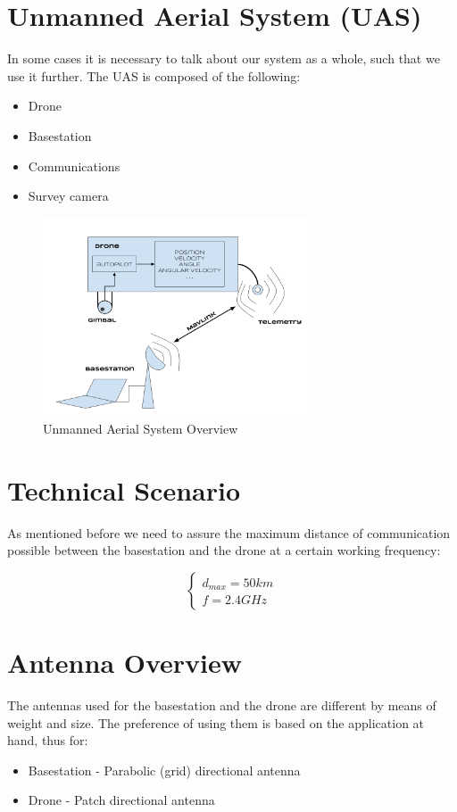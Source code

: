 \section*{Unmanned Aerial System (UAS)}
In some cases it is necessary to talk about our system as a whole, such that we use it further. The UAS is composed of the following:
\begin{itemize}
	\item Drone
	\item Basestation
	\item Communications
	\item Survey camera
\end{itemize}

\begin{figure}[h!]\label{fig:uas}
	\centering
	\includegraphics[width=0.7\textwidth]{figures/uas.png}
	\caption{Unmanned Aerial System Overview}
\end{figure}

\section*{Technical Scenario}
As mentioned before we need to assure the maximum distance of communication possible between the basestation and the drone at a certain working frequency:

\begin{equation*}\label{eq:tech_parameters1} 
 	\begin{cases}
 		d_{max} = 50 km	\\
 		f = 2.4 GHz
 	\end{cases}
\end{equation*}

\section*{Antenna Overview}
The antennas used for the basestation and the drone are different by means of weight and size. The preference of using them is based on the application at hand, thus for:
\begin{itemize}
	\item Basestation - Parabolic (grid) directional antenna 
	\item Drone - Patch directional antenna
\end{itemize}

